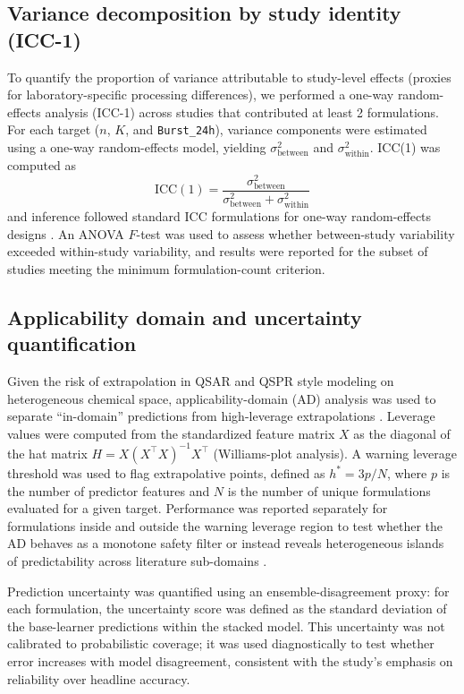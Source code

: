 \documentclass[preprint,12pt,authoryear]{elsarticle}
\begin{document}
\subsection{Variance decomposition by study identity (ICC-1)}
To quantify the proportion of variance attributable to study-level effects (proxies for laboratory-specific processing differences), we performed a one-way random-effects analysis (ICC-1) across studies that contributed at least 2 formulations. For each target ($n$, $K$, and \texttt{Burst\_24h}), variance components were estimated using a one-way random-effects model, yielding $\sigma^2_{\text{between}}$ and $\sigma^2_{\text{within}}$. ICC(1) was computed as
\begin{equation}
\mathrm{ICC}(1) = \frac{\sigma^2_{\text{between}}}{\sigma^2_{\text{between}} + \sigma^2_{\text{within}}}
\end{equation}
and inference followed standard ICC formulations for one-way random-effects designs \citep{ShroutFleiss1979ICC, McGrawWong1996ICCInference}. An ANOVA $F$-test was used to assess whether between-study variability exceeded within-study variability, and results were reported for the subset of studies meeting the minimum formulation-count criterion.

\subsection{Applicability domain and uncertainty quantification}
\label{sec:methods_ad_uq}
Given the risk of extrapolation in QSAR and QSPR style modeling on heterogeneous chemical space, applicability-domain (AD) analysis was used to separate ``in-domain'' predictions from high-leverage extrapolations \citep{OECD2004QSAR, OECD2007QSARGuidance, WeaverGleeson2008, Netzeva2005AD, Tropsha2010BestPracticesQSAR, Gramatica2007QSARValidation}. Leverage values were computed from the standardized feature matrix $X$ as the diagonal of the hat matrix $H = X(X^\top X)^{-1}X^\top$ (Williams-plot analysis). A warning leverage threshold was used to flag extrapolative points, defined as $h^* = 3p/N$, where $p$ is the number of predictor features and $N$ is the number of unique formulations evaluated for a given target. Performance was reported separately for formulations inside and outside the warning leverage region to test whether the AD behaves as a monotone safety filter or instead reveals heterogeneous islands of predictability across literature sub-domains \citep{WeaverGleeson2008, Netzeva2005AD}.

Prediction uncertainty was quantified using an ensemble-disagreement proxy: for each formulation, the uncertainty score was defined as the standard deviation of the base-learner predictions within the stacked model. This uncertainty was not calibrated to probabilistic coverage; it was used diagnostically to test whether error increases with model disagreement, consistent with the study's emphasis on reliability over headline accuracy.
\end{document}
